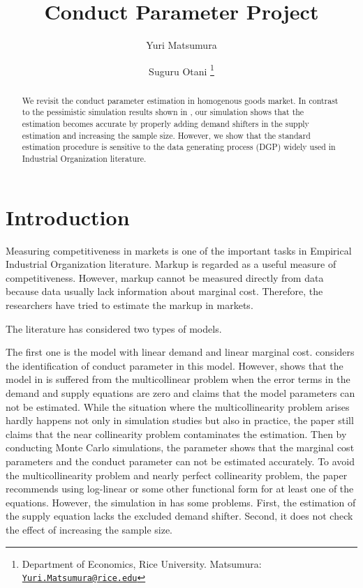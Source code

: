 \documentclass[11pt, a4paper]{article}
\title{Conduct Parameter Project}
\author{Yuri Matsumura \and Suguru Otani \footnote{Department of Economics, Rice University. Matsumura: \texttt{\href{mailto:Yuri.Matsumura@rice.edu}{Yuri.Matsumura@rice.edu}}}}
\begin{document}
\maketitle

\begin{abstract}
    We revisit the conduct parameter estimation in homogenous goods market. In contrast to the pessimistic simulation results shown in \cite{perloff2012collinearity}, our simulation shows that the estimation becomes accurate by properly adding demand shifters in the supply estimation and increasing the sample size. However, we show that the standard estimation procedure is sensitive to the data generating process (DGP) widely used in Industrial Organization literature. %
\end{abstract}

\section{Introduction}
Measuring competitiveness in markets is one of the important tasks in Empirical Industrial Organization literature.
Markup is regarded as a useful measure of competitiveness. 
However, markup cannot be measured directly from data because data usually lack information about marginal cost.
Therefore, the researchers have tried to estimate the markup in markets.



The literature has considered two types of models.

The first one is the model with linear demand and linear marginal cost.
\citet{bresnahan1982oligopoly} considers the identification of conduct parameter in this model.
However, \citet{perloff2012collinearity} shows that the model in \citet{bresnahan1982oligopoly} is suffered from the multicollinear problem when the error terms in the demand and supply equations are zero and claims that the model parameters can not be estimated.
While the situation where the multicollinearity problem arises hardly happens not only in simulation studies but also in practice, the paper still claims that the near collinearity problem contaminates the estimation.
Then by conducting Monte Carlo simulations, the parameter shows that the marginal cost parameters and the conduct parameter can not be estimated accurately.
To avoid the multicollinearity problem and nearly perfect collinearity problem, the paper recommends using log-linear or some other functional form for at least one of the equations.
However, the simulation in \cite{perloff2012collinearity} has some problems.
First, the estimation of the supply equation lacks the excluded demand shifter.
Second, it does not check the effect of increasing the sample size.
\end{document}
